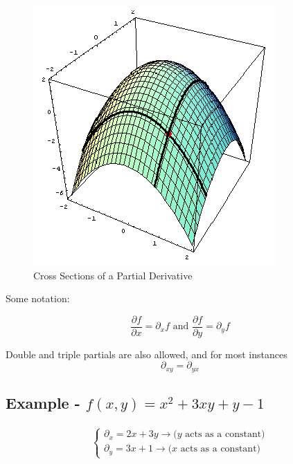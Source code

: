 \documentclass{article}
\begin{document}
\begin{figure}[h]
\centering
    \includegraphics[scale=0.5]{partials.png}
    \caption{Cross Sections of a Partial Derivative}
\end{figure}

Some notation:

\[
\frac{\partial f}{\partial x} = \partial_xf \text{ and }
\frac{\partial f}{\partial y} = \partial_yf
\]

Double and triple partials are also allowed, and for most instances
\[
\partial_{xy} = \partial_{yx}
\]

    \subsection{Example - $ f(x, y) = x^2 + 3xy + y - 1 $}
    \[
    \begin{aligned}
    \begin{cases}
    \partial_x = 2x + 3y \to \text{($y$ acts as a constant)}\\
    \partial_y = 3x + 1 \to \text{($x$ acts as a constant)}
    \end{cases}
    \end{aligned}
    \]
\end{document}

